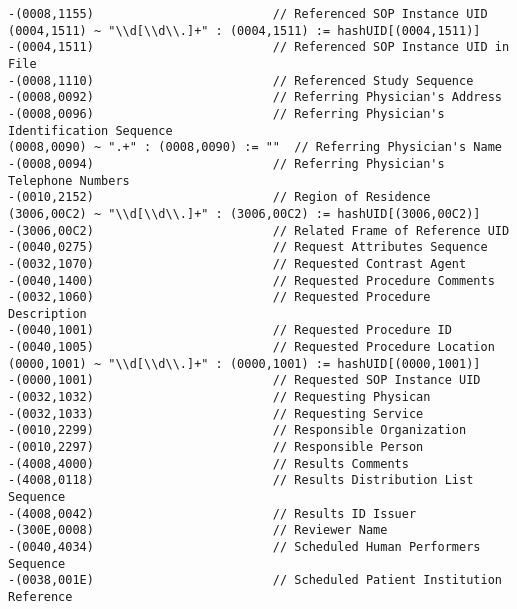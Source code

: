 \documentclass{beamer}  %
\begin{document}
\begin{frame}[fragile]
\tiny
\begin{verbatim}
-(0008,1155)                         // Referenced SOP Instance UID
(0004,1511) ~ "\\d[\\d\\.]+" : (0004,1511) := hashUID[(0004,1511)]                                     
-(0004,1511)                         // Referenced SOP Instance UID in File
-(0008,1110)                         // Referenced Study Sequence
-(0008,0092)                         // Referring Physician's Address
-(0008,0096)                         // Referring Physician's Identification Sequence
(0008,0090) ~ ".+" : (0008,0090) := ""  // Referring Physician's Name
-(0008,0094)                         // Referring Physician's Telephone Numbers
-(0010,2152)                         // Region of Residence
(3006,00C2) ~ "\\d[\\d\\.]+" : (3006,00C2) := hashUID[(3006,00C2)]
-(3006,00C2)                         // Related Frame of Reference UID
-(0040,0275)                         // Request Attributes Sequence
-(0032,1070)                         // Requested Contrast Agent
-(0040,1400)                         // Requested Procedure Comments
-(0032,1060)                         // Requested Procedure Description
-(0040,1001)                         // Requested Procedure ID
-(0040,1005)                         // Requested Procedure Location
(0000,1001) ~ "\\d[\\d\\.]+" : (0000,1001) := hashUID[(0000,1001)]
-(0000,1001)                         // Requested SOP Instance UID
-(0032,1032)                         // Requesting Physican
-(0032,1033)                         // Requesting Service
-(0010,2299)                         // Responsible Organization
-(0010,2297)                         // Responsible Person
-(4008,4000)                         // Results Comments
-(4008,0118)                         // Results Distribution List Sequence
-(4008,0042)                         // Results ID Issuer
-(300E,0008)                         // Reviewer Name
-(0040,4034)                         // Scheduled Human Performers Sequence
-(0038,001E)                         // Scheduled Patient Institution Reference
\end{verbatim}
\end{frame}
\end{document}
